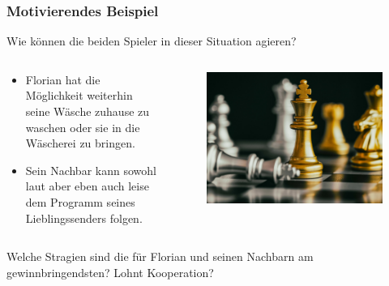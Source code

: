 \documentclass{beamer}
\begin{document}
        \begin{frame}
            \frametitle{Motivierendes Beispiel}
            Wie können die beiden Spieler in dieser Situation agieren?
            \begin{columns}
                \begin{column}{0.55\textwidth}
                    \begin{itemize}
                        \item Florian hat die Möglichkeit weiterhin seine Wäsche zuhause zu waschen oder sie in die Wäscherei
                            zu bringen.
                        \item Sein Nachbar kann sowohl laut aber eben auch leise dem Programm seines Lieblingssenders folgen. 
                    \end{itemize}        
                \end{column}
                \begin{column}{0.35\textwidth}
                    \begin{figure}
                        \includegraphics[scale = 0.045]{images/strategy_chess.jpg}
                    \end{figure}
                \end{column}
            \end{columns}
            \vspace{0.5cm}
            Welche Stragien sind die für Florian und seinen Nachbarn am gewinnbringendsten? Lohnt Kooperation?
        \end{frame}
\end{document}
